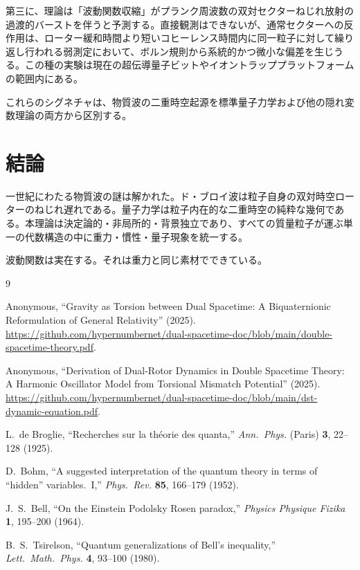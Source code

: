 \documentclass[a4paper]{article}
\begin{document}
第三に、理論は「波動関数収縮」がプランク周波数の双対セクターねじれ放射の過渡的バーストを伴うと予測する。直接観測はできないが、通常セクターへの反作用は、ローター緩和時間より短いコヒーレンス時間内に同一粒子に対して繰り返し行われる弱測定において、ボルン規則から系統的かつ微小な偏差を生じうる。この種の実験は現在の超伝導量子ビットやイオントラッププラットフォームの範囲内にある。

これらのシグネチャは、物質波の二重時空起源を標準量子力学および他の隠れ変数理論の両方から区別する。

\section{結論}

一世紀にわたる物質波の謎は解かれた。ド・ブロイ波は粒子自身の双対時空ローターのねじれ遅れである。量子力学は粒子内在的な二重時空の純粋な幾何である。本理論は決定論的・非局所的・背景独立であり、すべての質量粒子が運ぶ単一の代数構造の中に重力・慣性・量子現象を統一する。

波動関数は実在する。それは重力と同じ素材でできている。

\begin{thebibliography}{9}

Anonymous,
``Gravity as Torsion between Dual Spacetime: A Biquaternionic Reformulation of General Relativity'' (2025).
\url{https://github.com/hypernumbernet/dual-spacetime-doc/blob/main/double-spacetime-theory.pdf}.

Anonymous,
``Derivation of Dual-Rotor Dynamics in Double Spacetime Theory: A Harmonic Oscillator Model from Torsional Mismatch Potential'' (2025).
\url{https://github.com/hypernumbernet/dual-spacetime-doc/blob/main/dst-dynamic-equation.pdf}.

L.~de Broglie,
``Recherches sur la th\'eorie des quanta,''
\textit{Ann.\ Phys.} (Paris) \textbf{3}, 22--128 (1925).

D.~Bohm,
``A suggested interpretation of the quantum theory in terms of ``hidden'' variables.\ I,''
\textit{Phys.\ Rev.} \textbf{85}, 166--179 (1952).

J.~S.~Bell,
``On the Einstein Podolsky Rosen paradox,''
\textit{Physics Physique Fizika} \textbf{1}, 195--200 (1964).

B.~S.~Tsirelson,
``Quantum generalizations of Bell's inequality,''
\textit{Lett.\ Math.\ Phys.} \textbf{4}, 93--100 (1980).

\end{thebibliography}
\end{document}
